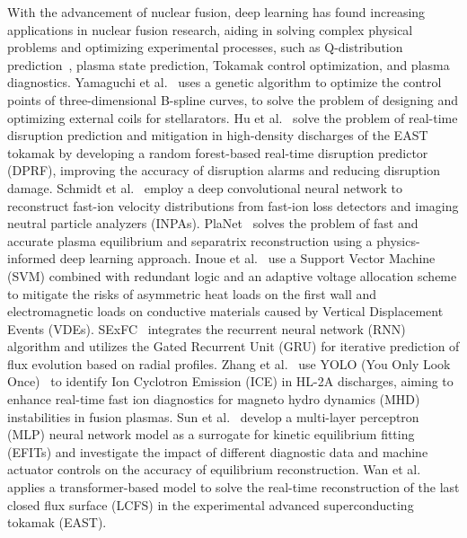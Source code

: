 With the advancement of nuclear fusion, deep learning has found increasing applications in nuclear fusion research, aiding in solving complex physical problems and optimizing experimental processes, such as Q-distribution prediction~\cite{wang2024MMQdist, ma2024MHNQdist}, plasma state prediction, Tokamak control optimization, and plasma diagnostics. 
Yamaguchi et al.~\cite{yamaguchi2021geneticoptimization} uses a genetic algorithm to optimize the control points of three-dimensional B-spline curves, to solve the problem of designing and optimizing external coils for stellarators. 
Hu et al.~\cite{hu2021randomforest} solve the problem of real-time disruption prediction and mitigation in high-density discharges of the EAST tokamak by developing a random forest-based real-time disruption predictor (DPRF), improving the accuracy of disruption alarms and reducing disruption damage. 
Schmidt et al.~\cite{schmidt2024neural} employ a deep convolutional neural network to reconstruct fast-ion velocity distributions from fast-ion loss detectors and imaging neutral particle analyzers (INPAs). PlaNet~\cite{bonotto2024planet} solves the problem of fast and accurate plasma equilibrium and separatrix reconstruction using a physics-informed deep learning approach. 
Inoue et al.~\cite{inoue2024svm} use a Support Vector Machine (SVM) combined with redundant logic and an adaptive voltage allocation scheme to mitigate the risks of asymmetric heat loads on the first wall and electromagnetic loads on conductive materials caused by Vertical Displacement Events (VDEs). 
SExFC~\cite{li2024RNNGRU} integrates the recurrent neural network (RNN) algorithm and utilizes the Gated Recurrent Unit (GRU) for iterative prediction of flux evolution based on radial profiles. 
Zhang et al.~\cite{zhang2024yolo} use YOLO (You Only Look Once)~\cite{cvpr2016yolo, cvpr2017yolo9000, farhadi2018yolov3} to identify Ion Cyclotron Emission (ICE) in HL-2A discharges, aiming to enhance real-time fast ion diagnostics for magneto hydro dynamics (MHD) instabilities in fusion plasmas. 
Sun et al.~\cite{sun2024impactmlp} develop a multi-layer perceptron (MLP) neural network model as a surrogate for kinetic equilibrium fitting (EFITs) and investigate the impact of different diagnostic data and machine actuator controls on the accuracy of equilibrium reconstruction. 
Wan et al.~\cite{wan2023transformer} applies a transformer-based model to solve the real-time reconstruction of the last closed flux surface (LCFS) in the experimental advanced superconducting tokamak (EAST).


